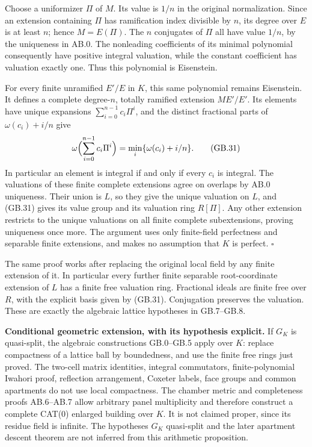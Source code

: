 \documentclass[
  11pt,
]{article}
\begin{document}
Choose a uniformizer \(\Pi\) of \(M\). Its value is \(1/n\) in the
original normalization. Since an extension containing \(\Pi\) has
ramification index divisible by \(n\), its degree over \(E\) is at least
\(n\); hence \(M=E(\Pi)\). The \(n\) conjugates of \(\Pi\) all have
value \(1/n\), by the uniqueness in AB.0. The nonleading coefficients of
its minimal polynomial consequently have positive integral valuation,
while the constant coefficient has valuation exactly one. Thus this
polynomial is Eisenstein.

For every finite unramified \(E'/E\) in \(K\), this same polynomial
remains Eisenstein. It defines a complete degree-\(n\), totally ramified
extension \(ME'/E'\). Its elements have unique expansions
\(\sum_{i=0}^{n-1}c_i\Pi^i\), and the distinct fractional parts of
\(\omega(c_i)+i/n\) give \[
 \omega\Bigl(\sum_{i=0}^{n-1}c_i\Pi^i\Bigr)
   =\min_i\{\omega(c_i)+i/n\}.
 \tag{GB.31}
\] In particular an element is integral if and only if every \(c_i\) is
integral. The valuations of these finite complete extensions agree on
overlaps by AB.0 uniqueness. Their union is \(L\), so they give the
unique valuation on \(L\), and (GB.31) gives its value group and its
valuation ring \(R[\Pi]\). Any other extension restricts to the unique
valuations on all finite complete subextensions, proving uniqueness once
more. The argument uses only finite-field perfectness and separable
finite extensions, and makes no assumption that \(K\) is perfect.
\(\square\)

The same proof works after replacing the original local field by any
finite extension of it. In particular every further finite separable
root-coordinate extension of \(L\) has a finite free valuation ring.
Fractional ideals are finite free over \(R\), with the explicit basis
given by (GB.31). Conjugation preserves the valuation. These are exactly
the algebraic lattice hypotheses in GB.7--GB.8.

\textbf{Conditional geometric extension, with its hypothesis explicit.}
If \(G_K\) is quasi-split, the algebraic constructions GB.0--GB.5 apply
over \(K\): replace compactness of a lattice ball by boundedness, and
use the finite free rings just proved. The two-cell matrix identities,
integral commutators, finite-polynomial Iwahori proof, reflection
arrangement, Coxeter labels, face groups and common apartments do not
use local compactness. The chamber metric and completeness proofs
AB.6--AB.7 allow arbitrary panel multiplicity and therefore construct a
complete CAT(0) enlarged building over \(K\). It is not claimed proper,
since its residue field is infinite. The hypotheses \(G_K\) quasi-split
and the later apartment descent theorem are not inferred from this
arithmetic proposition.
\end{document}
